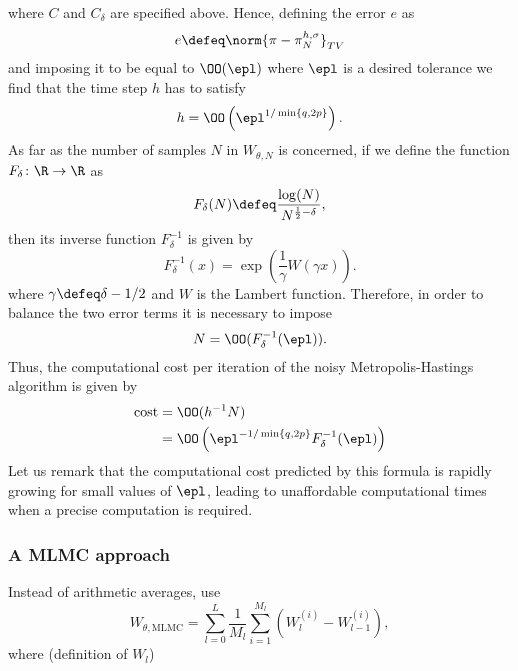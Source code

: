 where $C$ and $C_\delta$ are specified above. Hence, defining the error $e$ as
\begin{equation}
	e \defeq \norm{\pi- \pi_N^{h, \sigma}}_{TV}
\end{equation} 
and imposing it to be equal to $\OO(\epl)$ where $\epl$ is a desired tolerance we find that the time step $h$ has to satisfy
\begin{equation}
	h = \OO\left(\epl^{1/\min\left\{q,2p\right\}}\right).
\end{equation}
As far as the number of samples $N$ in $W_{\theta,N}$ is concerned, if we define the function $F_\delta\colon\R\to\R$ as
\begin{equation}
	F_\delta(N) \defeq \frac{\log(N)}{N^{\frac{1}{2} - \delta}},
\end{equation}
then its inverse function $F_\delta^{-1}$ is given by
\begin{equation}
	F_\delta^{-1}(x) = \exp\left(\frac{1}{\gamma}W(\gamma x)\right).
\end{equation}
where $\gamma \defeq \delta - 1/2$ and $W$ is the Lambert function. Therefore, in order to balance the two error terms it is necessary to impose
\begin{equation}
	N = \OO(F_\delta^{-1}(\epl)).
\end{equation}
Thus, the computational cost per iteration of the noisy Metropolis-Hastings algorithm is given by
\begin{equation}
\begin{aligned}
	\mathrm{cost} &= \OO(h^{-1}N) \\
				  &= \OO\left(\epl^{-1/\min\left\{q,2p\right\}}F_\delta^{-1}(\epl)\right)
\end{aligned}
\end{equation}
Let us remark that the computational cost predicted by this formula is rapidly growing for small values of $\epl$, leading to unaffordable computational times when a precise computation is required.

\subsubsection{A MLMC approach}
Instead of arithmetic averages, use 
\begin{equation}
	W_{\theta,\text{MLMC}} = \sum_{l=0}^{L} \frac{1}{M_l} \sum_{i=1}^{M_l}\left(W_l^{(i)} - W_{l-1}^{(i)}\right),
\end{equation}
where (definition of $W_{l}$)



